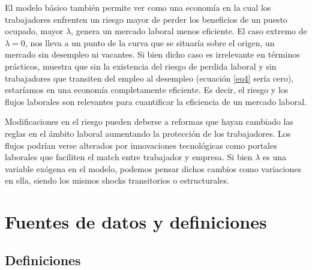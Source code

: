 \documentclass[12pt,oneside]{reedthesis}
\begin{document}
El modelo básico también permite ver como una economía en la cual los trabajadores enfrenten un riesgo mayor de perder los beneficios de un puesto ocupado, mayor \(\lambda\), genera un mercado laboral menos eficiente. El caso extremo de \(\lambda=0\), nos lleva a un punto de la curva que se situaría sobre el origen, un mercado sin desempleo ni vacantes. Si bien dicho caso es irrelevante en términos prácticos, muestra que sin la existencia del riesgo de perdida laboral y sin trabajadores que transiten del empleo al desempleo (ecuación \eqref{eq4} sería cero), estaríamos en una economía completamente eficiente. Es decir, el riesgo y los flujos laborales son relevantes para cuantificar la eficiencia de un mercado laboral.

Modificaciones en el riesgo pueden deberse a reformas que hayan cambiado las reglas en el ámbito laboral aumentando la protección de los trabajadores. Los flujos podrían verse alterados por innovaciones tecnológicas como portales laborales que faciliten el match entre trabajador y empresa. Si bien \(\lambda\) es una variable exógena en el modelo, podemos pensar dichos cambios como variaciones en ella, siendo los mismos shocks transitorios o estructurales.

\hypertarget{cap:Datos}{%
\chapter{Fuentes de datos y definiciones}\label{cap:Datos}}

\hypertarget{definiciones}{%
\section{Definiciones}\label{definiciones}}
\end{document}
